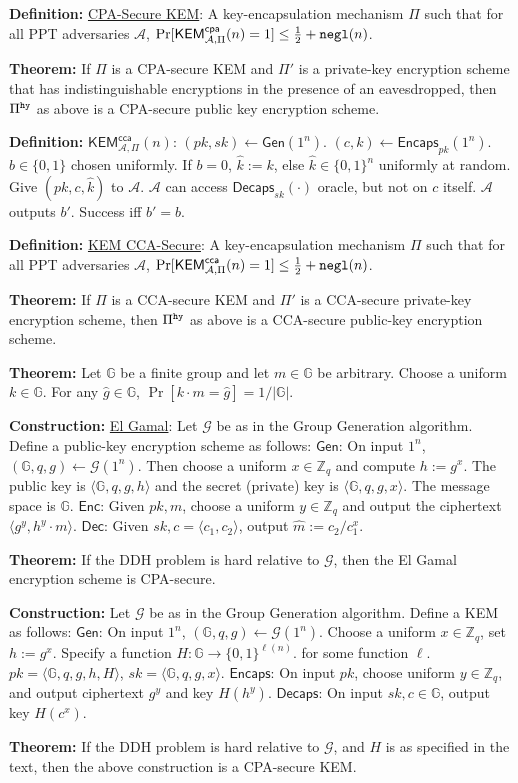 \documentclass[10pt]{article}
\newcommand{\Z}{\mathbb{Z}}
\newcommand{\G}{\mathbb{G}}
\newcommand{\AAA}{\mathcal{A}}
\newcommand{\GGG}{\mathcal{G}}
\newcommand{\defn}[1]{{\bf Definition:} \underline{#1}}
\newcommand{\thm}[1]{{\bf Theorem:} \underline{#1}}
\newcommand{\con}[1]{{\bf Construction:} \underline{#1}}
\newcommand{\Enc}{\mathsf{Enc}}
\newcommand{\Dec}{\mathsf{Dec}}
\newcommand{\Encaps}{\mathsf{Encaps}}
\newcommand{\Decaps}{\mathsf{Decaps}}
\newcommand{\Gen}{\mathsf{Gen}}
\newcommand{\ang}[1]{\langle#1\rangle}
\newcommand{\ExptKemCpa}{\mathsf{KEM}^{\mathsf{cpa}}_{\AAA,\Pi}}
\newcommand{\ExptKemCca}{\mathsf{KEM}^{\mathsf{cca}}_{\AAA,\Pi}}
\newcommand{\negl}{{\tt negl}}
\newcommand{\hy}{{\tt hy}}
\newcommand{\from}{\leftarrow}
\begin{document}
\begin{multicols}{4}
\defn{CPA-Secure KEM}: A key-encapsulation mechanism $\Pi$ such that for all PPT adversaries $\AAA$, $\Pr[\ExptKemCpa(n)=1]\leq\frac{1}{2}+\negl(n)$.

\thm{}If $\Pi$ is a CPA-secure KEM and $\Pi'$ is a private-key encryption scheme that has indistinguishable encryptions in the presence of an eavesdropped, then $\Pi^\hy$ as above is a CPA-secure public key encryption scheme.

\defn{$\ExptKemCca(n)$}: $(pk,sk)\from\Gen(1^n)$. $(c,k)\from\Encaps_{pk}(1^n)$. $b\in\{0,1\}$ chosen uniformly. If $b=0$, $\hat{k}:=k$, else $\hat{k}\in\{0,1\}^n$ uniformly at random. Give $(pk,c,\hat{k})$ to $\AAA$. $\AAA$ can access $\Decaps_{sk}(\cdot)$ oracle, but not on $c$ itself. $\AAA$ outputs $b'$. Success iff $b'=b$.

\defn{KEM CCA-Secure}: A key-encapsulation mechanism $\Pi$ such that for all PPT adversaries $\AAA$, $\Pr[\ExptKemCca(n)=1]\leq\frac{1}{2}+\negl(n)$.

\thm{}If $\Pi$ is a CCA-secure KEM and $\Pi'$ is a CCA-secure private-key encryption scheme, then $\Pi^\hy$ as above is a CCA-secure public-key encryption scheme.

\thm{}Let $\G$ be a finite group and let $m\in\G$ be arbitrary. Choose a uniform $k\in\G$. For any $\hat{g}\in\G$, $\Pr[k\cdot m=\hat{g}]=1/|\G|$.

\con{El Gamal}: Let $\GGG$ be as in the Group Generation algorithm. Define a public-key encryption scheme as follows: $\Gen$: On input $1^n$, $(\G,q,g)\from\GGG(1^n)$. Then choose a uniform $x\in\Z_q$ and compute $h:=g^x$. The public key is $\ang{\G,q,g,h}$ and the secret (private) key is $\ang{\G,q,g,x}$. The message space is $\G$. $\Enc$: Given $pk,m$, choose a uniform $y\in\Z_q$ and output the ciphertext $\ang{g^y,h^y\cdot m}$. $\Dec$: Given $sk,c=\ang{c_1,c_2}$, output $\hat{m}:=c_2/c_1^x$.

\thm{}If the DDH problem is hard relative to $\GGG$, then the El Gamal encryption scheme is CPA-secure.

\con{}Let $\GGG$ be as in the Group Generation algorithm. Define a KEM as follows: $\Gen$: On input $1^n$, $(\G,q,g)\from\GGG(1^n)$. Choose a uniform $x\in\Z_q$, set $h:=g^x$. Specify a function $H:\G\to\{0,1\}^{\ell(n)}$. for some function $\ell$. $pk=\ang{\G,q,g,h,H}$, $sk=\ang{\G,q,g,x}$. $\Encaps$: On input $pk$, choose uniform $y\in\Z_q$, and output ciphertext $g^y$ and key $H(h^y)$. $\Decaps$: On input $sk,c\in\G$, output key $H(c^x)$.

\thm{}If the DDH problem is hard relative to $\GGG$, and $H$ is as specified in the text, then the above construction is a CPA-secure KEM.


\end{multicols}
\end{document}
